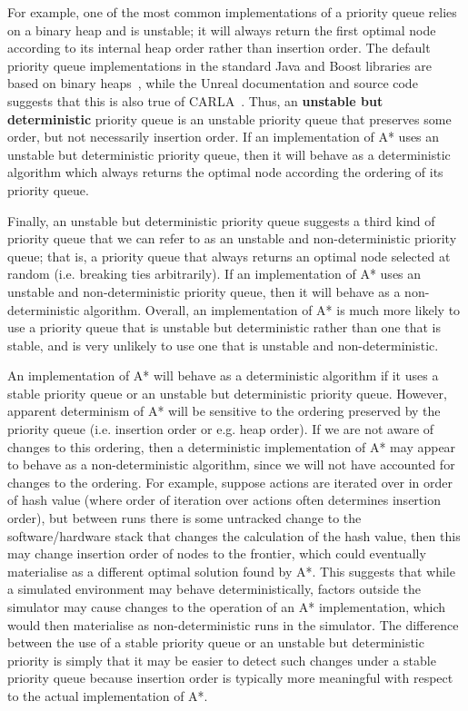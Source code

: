 For example, one of the most common implementations of a priority queue relies on a binary heap and is unstable; it will always return the first optimal node according to its internal heap order rather than insertion order. The default priority queue implementations in the standard Java and Boost libraries are based on binary heaps~\cite{boost2021,priorityQueue}, while the Unreal documentation and source code suggests that this is also true of CARLA~\cite{FGraphAStar,TArray,GraphAStar}. Thus, an \textbf{unstable but deterministic} priority queue is an unstable priority queue that preserves some order, but not necessarily insertion order. If an implementation of A* uses an unstable but deterministic priority queue, then it will behave as a deterministic algorithm which always returns the optimal node according the ordering of its priority queue. 

Finally, an unstable but deterministic priority queue suggests a third kind of priority queue that we can refer to as an unstable and non-deterministic priority queue; that is, a priority queue that always returns an optimal node selected at random (i.e. breaking ties arbitrarily). If an implementation of A* uses an unstable and non-deterministic priority queue, then it will behave as a non-deterministic algorithm. Overall, an implementation of A* is much more likely to use a priority queue that is unstable but deterministic rather than one that is stable, and is very unlikely to use one that is unstable and non-deterministic.

An implementation of A* will behave as a deterministic algorithm if it uses a stable priority queue or an unstable but deterministic priority queue. However, apparent determinism of A* will be sensitive to the ordering preserved by the priority queue (i.e. insertion order or e.g. heap order). If we are not aware of changes to this ordering, then a deterministic implementation of A* may appear to behave as a non-deterministic algorithm, since we will not have accounted for changes to the ordering. For example, suppose actions are iterated over in order of hash value (where order of iteration over actions often determines insertion order), but between runs there is some untracked change to the software/hardware stack that changes the calculation of the hash value, then this may change insertion order of nodes to the frontier, which could eventually materialise as a different optimal solution found by A*. This suggests that while a simulated environment may behave deterministically, factors outside the simulator may cause changes to the operation of an A* implementation, which would then materialise as non-deterministic runs in the simulator. The difference between the use of a stable priority queue or an unstable but deterministic priority is simply that it may be easier to detect such changes under a stable priority queue because insertion order is typically more meaningful with respect to the actual implementation of A*.

